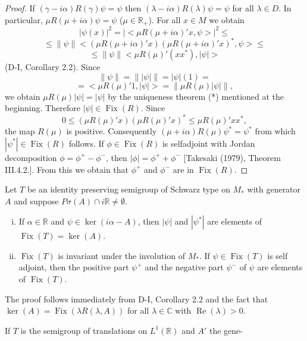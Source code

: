 
\begin{proof}
If $(\gamma - i\alpha)R(\gamma)\psi = \psi$ then $(\lambda - i\alpha)R(\lambda)\psi = \psi$ for all $\lambda \in D$.
In particular, $\mu R(\mu + i\alpha)\psi = \psi$ ($\mu \in \mathbb{R}_+$).
For all $x \in M$ we obtain
\[
|\psi(x)|^2 = |<\mu R(\mu+i\alpha)'x,\psi>|^2 \leq
\]
\[
\leq \|\psi\| <(\mu R(\mu+i\alpha)'x)(\mu R(\mu+i\alpha)'x)^*,\psi> \leq
\]
\[
\leq \|\psi\| <\mu R(\mu)'(xx^*),|\psi|>
\]
(D-I, Corollary 2.2).
Since
\[
\|\psi\| = \| |\psi| \| = |\psi|(1) =
\]
\[
= <\mu R(\mu)'1,|\psi|> = \| \mu R(\mu)|\psi| \|,
\]
we obtain $\mu R(\mu)|\psi| = |\psi|$ by the uniqueness theorem (*) mentioned at the beginning.
Therefore $|\psi| \in \operatorname{Fix}(R)$.
Since
\[
0 \leq (\mu R(\mu)'x)(\mu R(\mu)'x)^* \leq \mu R(\mu)'xx^*,
\]
the map $R(\mu)$ is positive.
Consequently $(\mu+i\alpha)R(\mu)\psi^* = \psi^*$ from which $|\psi^*| \in \operatorname{Fix}(R)$ follows.
If $\phi \in \operatorname{Fix}(R)$ is selfadjoint with Jordan decomposition $\phi = \phi^+ - \phi^-$, then $|\phi| = \phi^+ + \phi^-$ [Takesaki (1979), Theorem III.4.2.].
From this we obtain that $\phi^+$ and $\phi^-$ are in $\operatorname{Fix}(R)$.
\end{proof}
\begin{corollary}\label{cor:1.5}
Let $T$ be an identity preserving semigroup of Schwarz type on $M_*$ with generator $A$ and suppose $P\sigma(A) \cap i\mathbb{R} \neq \emptyset$.

\begin{enumerate}[(i)]
\item
If $\alpha \in \mathbb{R}$ and $\psi \in \operatorname{ker}(i\alpha - A)$, then $|\psi|$ and $|\psi^*|$ are elements of $\operatorname{Fix}(T) = \operatorname{ker}(A)$.

\item 
$\operatorname{Fix}(T)$ is invariant under the involution of $M_*$.
If $\psi \in \operatorname{Fix}(T)$ is self adjoint, then the positive part $\psi^+$ and the negative part $\psi^-$ of $\psi$ are elements of $\operatorname{Fix}(T)$.
\end{enumerate}

\end{corollary}
The proof follows immediately from D-I, Corollary 2.2 and the fact that $\operatorname{ker}(A) = \operatorname{Fix}(\lambda R(\lambda,A))$ for all $\lambda \in \mathbb{C}$ with $\operatorname{Re}(\lambda) > 0$.

If $T$ is the semigroup of translations on $L^1(\mathbb{R})$ and $A'$ the gene-

